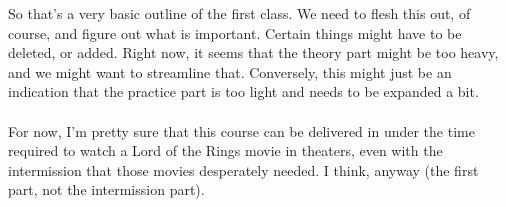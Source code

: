 \documentclass[11pt]{article}
\begin{document}
So that's a very basic outline of the first class. We need to flesh this out, of course, and figure out what is important. Certain things might have to be deleted, or added. Right now, it seems that the theory part might be too heavy, and we might want to streamline that. Conversely, this might just be an indication that the practice part is too light and needs to be expanded a bit.
\\
\\
For now, I'm pretty sure that this course can be delivered in under the time required to watch a Lord of the Rings movie in theaters, even with the intermission that those movies desperately needed. I think, anyway (the first part, not the intermission part).
\end{document}
